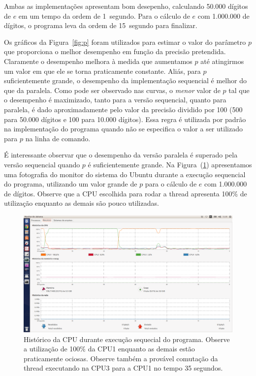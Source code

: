 \documentclass[12pt]{article}
\begin{document}
Ambas as implementações apresentam bom desepenho, calculando 50.000 dígitos de $e$ em um tempo da 
ordem de 1~segundo. Para o cálculo de $e$ com 1.000.000 de dígitos, o programa leva da ordem de 
15~segundo para finalizar.

Os gráficos da Figura~\ref{fig:p} foram utilizados para estimar o valor do parâmetro $p$ que 
proporciona o melhor desempenho em função da precisão pretendida. Claramente o desempenho melhora à 
medida que aumentamos $p$ até atingirmos um valor em que ele se torna praticamente constante. Aliás, 
para $p$ suficientemente grande, o desempenho da implementação sequencial é melhor do que da 
paralela. Como pode ser observado nas curvas, o {\it menor} valor de $p$ tal que o desempenho é 
maximizado, tanto para a versão sequencial, quanto para paralela, é dado aproximadamente pelo valor 
da precisão dividido por 100 (500 para 50.000 dígitos e 100 para 10.000 dígitos). Essa regra é 
utilizada por padrão na implementação do programa quando não se especifica o valor a ser utilizado 
para $p$ na linha de comando. 

É interessante observar que o desempenho da versão paralela é superado pela versão sequencial quando
$p$ é suficientemente grande. Na Figura~(\ref{fig:seq}) apresentamos uma fotografia do monitor do 
sistema do Ubuntu durante a execução sequencial do programa, utilizando um valor grande de $p$ para
o cálculo de $e$ com 1.000.000 de dígitos. Observe que a CPU escolhida para rodar a thread apresenta 
100\% de utilização enquanto as demais são pouco utilizadas.  
%
\begin{figure}[ht]
	\begin{center}
		\includegraphics[scale=0.275]{sequencial.png}
		\caption{Histórico da CPU durante execução sequecial do programa. Observe a utilização de 100\%
		da CPU1 enquanto as demais estão praticamente ociosas. Observe também a provável comutação da 
		thread executando na CPU3 para a CPU1 no tempo 35 segundos.}
		\label{fig:seq} 
	\end{center}
\end{figure}
\end{document}
